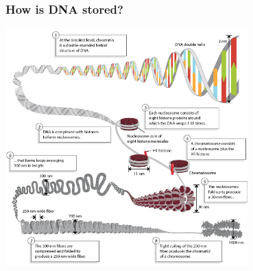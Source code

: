 \documentclass{beamer}
\begin{document}
	
\begin{frame}
	\frametitle{How is DNA stored?}
	
	\centering \includegraphics[keepaspectratio, width  =0.7\textwidth]{img/DNA_packing}
	
\end{frame}
\end{document}
